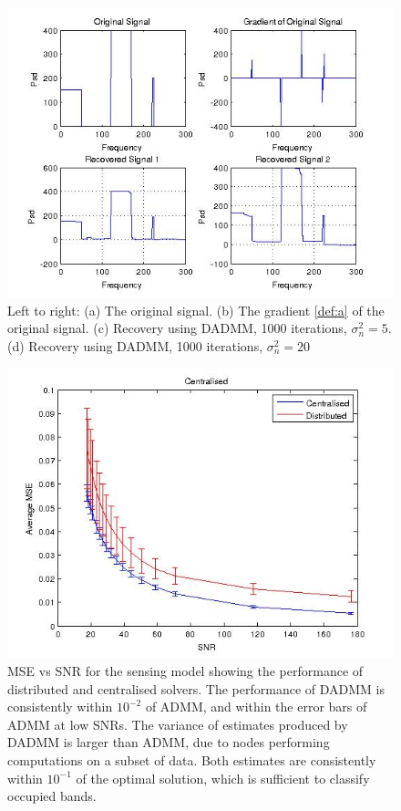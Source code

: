 \documentclass[conference]{IEEEtran}
\begin{document}
\begin{figure}[h]
\centering
\includegraphics[height = 7.3 cm]{signal_and_recovery.jpg}
\caption{Left to right: (a) The original signal. (b) The gradient \eqref{def:a} of the original signal. (c) Recovery using DADMM, 1000 iterations, \(\sigma^2_n = 5\). (d) Recovery using DADMM, 1000 iterations, \(\sigma^2_n = 20\)  }
\label{different_sigs}
\end{figure}

\begin{figure}[h]
\centering
\includegraphics[height = 7.3 cm]{Cent_Vs_Distrib_snr.jpg}
\caption{MSE vs SNR for the sensing model showing the performance of distributed and centralised solvers. The performance of DADMM is consistently within \(10^{-2}\) of ADMM, and within the error bars of ADMM at low SNRs. The variance of estimates produced by DADMM is larger than ADMM, due to nodes performing computations on a subset of data. Both estimates are consistently within \(10^{-1}\) of the optimal solution, which is sufficient to classify occupied bands.} 
\label{msevssnr0}
\end{figure}
\end{document}
